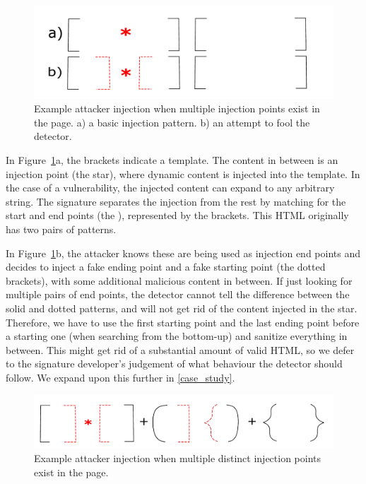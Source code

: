 \begin{figure}[h]
	\includegraphics[scale=0.25]{img/attacker_injection_compound.pdf}
	\caption{Example attacker injection when multiple injection points exist in the page. a) a basic injection pattern. b) an attempt to fool the detector.}
	\label{fig:attacker_injection}
\end{figure}

In Figure~\ref{fig:attacker_injection}a, the brackets indicate a
template. The content in between is an injection point (the star),
where dynamic content is injected into the template. In the case of a
vulnerability, the injected content can expand to any arbitrary
string. The signature separates the injection from the rest by
matching for the start and end points (the ),
represented by the brackets. This HTML originally has two pairs of
 patterns.

In Figure~\ref{fig:attacker_injection}b, the attacker knows these are
being used as injection end points and decides to inject a fake ending
point and a fake starting point (the dotted brackets), with some
additional malicious content in between. If just looking for multiple
pairs of end points, the detector cannot tell the difference between
the solid and dotted patterns, and will not get rid of the content
injected in the star. Therefore, we have to use the first starting
point and the last ending point before a starting one (when searching
from the bottom-up) and sanitize everything in between. This might get
rid of a substantial amount of valid HTML, so we defer to the
signature developer's judgement of what behaviour the detector should
follow. We expand upon this further in \autoref{case_study}.


\begin{figure}[h]
	\includegraphics[scale=0.25]{img/attacker_injection_unique.pdf}
	\caption{Example attacker injection when multiple distinct injection points exist in the page.}
	\label{fig:attacker_injection_unique}
\end{figure}


